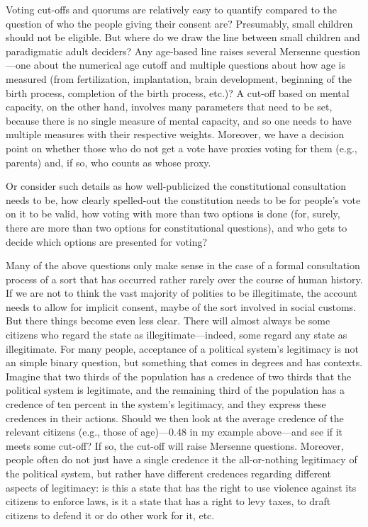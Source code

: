 Voting cut-offs and quorums are relatively easy to quantify compared to the question of who the people giving their consent are?
Presumably, small children should not be eligible. But where do we draw the line between small children and paradigmatic adult
deciders? Any age-based line raises several Mersenne question---one about the numerical age cutoff and multiple questions about 
how age is measured (from fertilization, implantation, brain development, beginning of the birth process, completion of the
birth process, etc.)? A cut-off based on mental capacity, on the other hand, involves many parameters that need to be set, because
there is no single measure of mental capacity, and so one needs to have multiple measures with their respective weights. Moreover,
we have a decision point on whether those who do not get a vote have proxies voting for them (e.g., parents) and, if so, who 
counts as whose proxy.

Or consider such details as how well-publicized the constitutional consultation needs to be, how clearly spelled-out the 
constitution needs to be for people's vote on it to be valid, how voting with more than two options is done (for, surely,
there are more than two options for constitutional questions), and who gets to decide which options are presented for
voting?

Many of the above questions only make sense in the case of a formal consultation process of a sort that has occurred rather
rarely over the course of human history. If we are not to think the vast majority of polities to be illegitimate, the account
needs to allow for implicit consent, maybe of the sort involved in social customs. But there things become even less clear.
There will almost always be some citizens who regard the state as illegitimate---indeed, some regard any state 
as illegitimate. For many people, acceptance of a political system's legitimacy is not an simple binary question, but 
something that comes in degrees and has contexts. Imagine that two thirds of the population has a credence of two thirds
that the political system is legitimate, and the remaining third of the population has a credence of ten percent in 
the system's legitimacy, and they express these credences in their actions. Should we then look at the average credence
of the relevant citizens (e.g., those of age)---$0.48$ in my example above---and see if it meets some cut-off? If so, the
cut-off will raise Mersenne questions. Moreover, people often do not just have a single credence it the all-or-nothing 
legitimacy of the political system, but rather have different credences regarding different aspects of legitimacy: is this
a state that has the right to use violence against its citizens to enforce laws, is it a state that has a right to levy taxes,
to draft citizens to defend it or do other work for it, etc.

